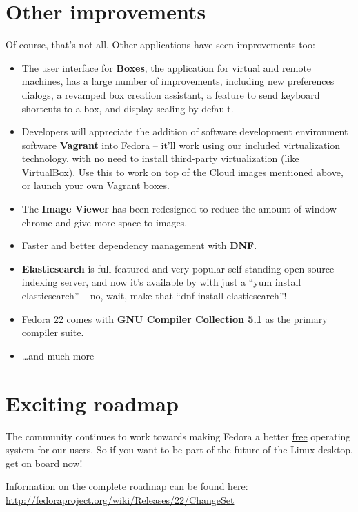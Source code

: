 \documentclass[
letterpaper,
10pt
]{leaflet}
\begin{document}
\section{\textcolor{FedoraBlue}{Other improvements}}
Of course, that's not all. Other applications have seen improvements too:
\begin{itemize}
  \item The user interface for \textbf{Boxes}, the application for virtual and remote machines, has a large number of improvements, including new preferences dialogs, a revamped box creation assistant, a feature to send keyboard shortcuts to a box, and display scaling by default.
  \item Developers will appreciate the addition of software development environment software \textbf{Vagrant} into Fedora -- it'll work using our included virtualization technology, with no need to install third-party virtualization (like VirtualBox). Use this to work on top of the Cloud images mentioned above, or launch your own Vagrant boxes.
  \item The \textbf{Image Viewer} has been redesigned to reduce the amount of window chrome and give more space to images. 
  \item Faster and better dependency management with \textbf{DNF}.
  \item \textbf{Elasticsearch} is full-featured and very popular self-standing open source indexing server, and now it's available by with just a ``yum install elasticsearch'' -- no, wait, make that ``dnf install elasticsearch''! 
  \item Fedora 22 comes with \textbf{GNU Compiler Collection 5.1} as the primary compiler suite.
  \item \ldots and much more
\end{itemize}

\section{\textcolor{FedoraBlue}{Exciting roadmap}}
The community continues to work towards making Fedora a better \href{http://www.gnu.org/philosophy/free-sw.en.html}{free} operating system for our users.  So if you want to be part of the future of the Linux desktop, get on board now!

Information on the complete roadmap can be found here:\\ \href{http://fedoraproject.org/wiki/Releases/22/ChangeSet}{http://fedoraproject.org/wiki/Releases/22/ChangeSet}
\end{document}

